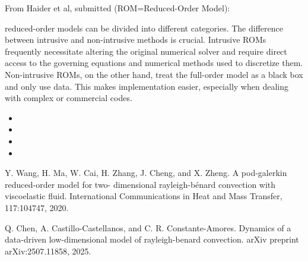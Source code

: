 
From Haider et al, submitted (ROM=Reduced-Order Model):
\begin{displayquote}
reduced-order models can be divided into different categories. The
difference between intrusive and non-intrusive methods is crucial. Intrusive ROMs frequently necessitate
altering the original numerical solver and require direct access to the governing equations and numerical
methods used to discretize them. Non-intrusive ROMs, on the other hand, treat the full-order model as
a black box and only use data. This makes implementation easier, especially when dealing with complex
or commercial codes.
\end{displayquote}

\begin{itemize}
\item {}
\item {}
\item {}
\item {}
\end{itemize}

Y. Wang, H. Ma, W. Cai, H. Zhang, J. Cheng, and X. Zheng. A pod-galerkin reduced-order model for two-
dimensional rayleigh-bénard convection with viscoelastic fluid. International Communications in Heat and Mass
Transfer, 117:104747, 2020.

Q. Chen, A. Castillo-Castellanos, and C. R. Constante-Amores. Dynamics of a data-driven low-dimensional model of
rayleigh-benard convection. arXiv preprint arXiv:2507.11858, 2025.

